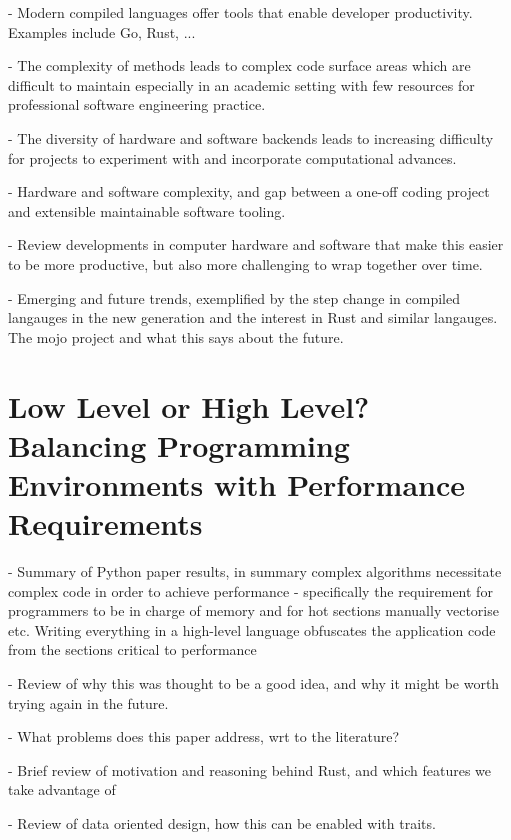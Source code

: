 - Modern compiled languages offer tools that enable developer productivity. Examples include Go, Rust, ...

- The complexity of methods leads to complex code surface areas which are difficult to maintain especially in an academic setting with few resources for professional software engineering practice.

- The diversity of hardware and software backends leads to increasing difficulty for projects to experiment with and incorporate computational advances.

- Hardware and software complexity, and gap between a one-off coding project and extensible maintainable software tooling.

- Review developments in computer hardware and software that make this easier to be more productive, but also more challenging to wrap together over time.

- Emerging and future trends, exemplified by the step change in compiled langauges in the new generation and the interest in Rust and similar langauges. The mojo project and what this says about the future.


\section{Low Level or High Level? Balancing Programming Environments with Performance Requirements}

- Summary of Python paper results, in summary complex algorithms necessitate complex code in order to achieve performance - specifically the requirement for programmers to be in charge of memory and for hot sections manually vectorise etc. Writing everything in a high-level language obfuscates the application code from the sections critical to performance

- Review of why this was thought to be a good idea, and why it might be worth trying again in the future.

- What problems does this paper address, wrt to the literature?

- Brief review of motivation and reasoning behind Rust, and which features we take advantage of

- Review of data oriented design, how this can be enabled with traits.

% 
% 
% 
% 
